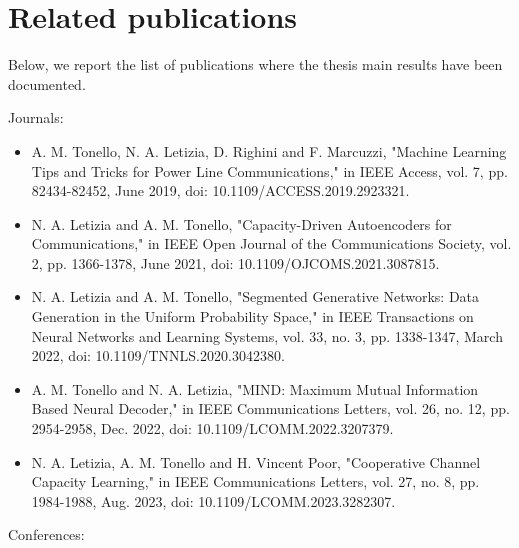 \section{Related publications}
\label{sec:relatedpub}
Below, we report the list of publications where the thesis main results have been documented. 

\noindent Journals:
\begin{itemize}
	\item A. M. Tonello, N. A. Letizia, D. Righini and F. Marcuzzi, "Machine Learning Tips and Tricks for Power Line Communications," in IEEE Access, vol. 7, pp. 82434-82452, June 2019, doi: 10.1109/ACCESS.2019.2923321.
     \item N. A. Letizia and A. M. Tonello, "Capacity-Driven Autoencoders for Communications," in IEEE Open Journal of the Communications Society, vol. 2, pp. 1366-1378, June 2021, doi: 10.1109/OJCOMS.2021.3087815.
	\item N. A. Letizia and A. M. Tonello, "Segmented Generative Networks: Data Generation in the Uniform Probability Space," in IEEE Transactions on Neural Networks and Learning Systems, vol. 33, no. 3, pp. 1338-1347, March 2022, doi: 10.1109/TNNLS.2020.3042380.
	
        \item A. M. Tonello and N. A. Letizia, "MIND: Maximum Mutual Information Based Neural Decoder," in IEEE Communications Letters, vol. 26, no. 12, pp. 2954-2958, Dec. 2022, doi: 10.1109/LCOMM.2022.3207379.
        \item N. A. Letizia, A. M. Tonello and H. Vincent Poor, "Cooperative Channel Capacity Learning," in IEEE Communications Letters, vol. 27, no. 8, pp. 1984-1988, Aug. 2023, doi: 10.1109/LCOMM.2023.3282307.
\end{itemize}
Conferences:
